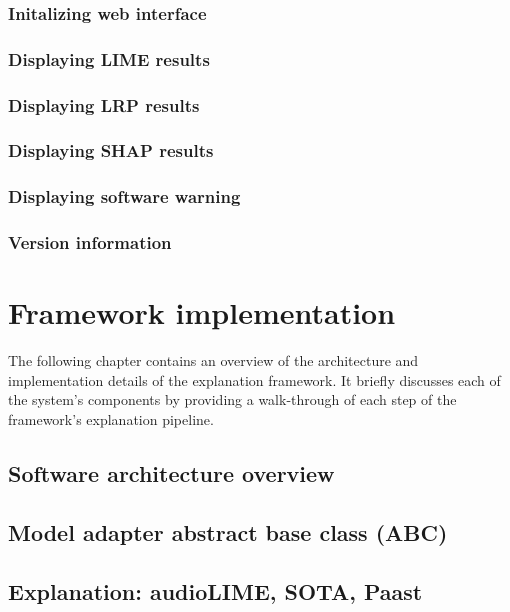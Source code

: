 \documentclass[
    bindingoffset=5mm,  %
    footnoteindent=3mm, %
    hyphenation=true    %
]{src/wut-thesis}
\begin{document}
\subsubsection{Initalizing web interface}
\subsubsection{Displaying LIME results}
\subsubsection{Displaying LRP results}
\subsubsection{Displaying SHAP results}
\subsubsection{Displaying software warning}
\subsubsection{Version information}

%
%
\clearpage %
\section{Framework implementation} \label{ch:implementation}

    The following chapter contains an overview of the architecture and implementation details of the explanation framework.
    It briefly discusses each of the system's components by providing a walk-through of each step of the framework's explanation pipeline.

\subsection{Software architecture overview}

\subsection{Model adapter abstract base class (ABC)}
\subsection{Explanation: audioLIME, SOTA, Paast}
\end{document}

